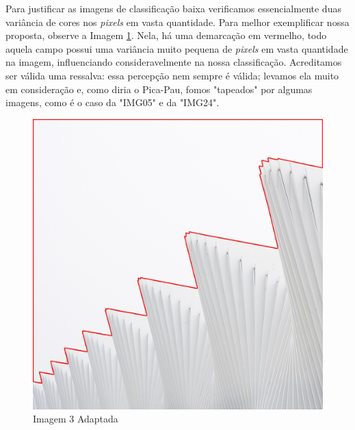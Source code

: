 \hspace{1.5 cm} Para justificar as imagens de classificação baixa verificamos essencialmente duas variância de cores nos \textit{pixels} em vasta quantidade. Para melhor exemplificar nossa proposta, observe a Imagem \ref{fig:imagem_3}. Nela, há uma demarcação em vermelho, todo aquela campo possui uma variância muito pequena de \textit{pixels} em vasta quantidade na imagem, influenciando consideravelmente na nossa classificação. Acreditamos ser válida uma ressalva: essa percepção nem sempre é válida; levamos ela muito em consideração e, como diria o Pica-Pau, fomos "tapeados" por algumas imagens, como é o caso da "IMG05" e da "IMG24".

\begin{figure}[H]
    \centering
    
    \caption{Imagem 3 Adaptada}
    \label{fig:imagem_3}
    
    \includegraphics[scale=0.2]{Documeto/1-ElementosTextuais/1-Desenvolvimento/imagens-atividade2/IMG03.png}

\end{figure}


